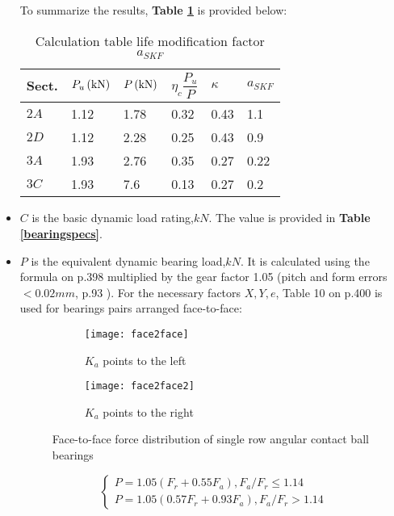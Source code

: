 \begin{itemize}
	To summarize the results, \textbf{Table \ref{askf}} is provided below:
	\begin{table}[ht]
		\centering
		\caption{Calculation table life modification factor $ a_{SKF} $}
		\begin{tabular}{llllll}\toprule
			Sect. & $ P_u \, (\mathrm{kN}) $ & $ P \, (\mathrm{kN}) $ & $ \eta_c \dfrac{P_u}{P} $ & $ \kappa $ & $ a_{SKF} $ \\ \midrule
			$ 2A $ & 1.12 & 1.78 & 0.32 & 0.43 & 1.1\\
			$ 2D $ & 1.12 & 2.28 & 0.25 & 0.43 & 0.9\\
			$ 3A $ & 1.93 & 2.76 & 0.35 & 0.27 & 0.22\\
			$ 3C $ & 1.93 & 7.6  & 0.13 & 0.27 & 0.2\\
			\bottomrule
		\end{tabular}
		\label{askf}
	\end{table}
	\item $ C $ is the basic dynamic load rating,$ \unit{kN} $. The value is provided in \textbf{Table \ref{bearingspecs}}.
	\item $ P $ is the equivalent dynamic bearing load,$ \unit{kN} $. It is calculated using the formula on p.398 \cite{rolling_bearings} multiplied by the gear factor 1.05 (pitch and form errors $ < 0.02 \unit{mm} $, p.93 \cite{rolling_bearings}). For the necessary factors $ X,Y,e $, Table 10 on p.400 \cite{rolling_bearings} is used for bearings pairs arranged face-to-face:
	\begin{figure}[ht]
		\centering
		\begin{subfigure}{.4\linewidth}
			\centering
			\texttt{[image: face2face]}
			\caption{$ K_a $ points to the left}
			\label{face2face}
		\end{subfigure}\hspace*{0.1\linewidth}
		\begin{subfigure}{.4\linewidth}
			\centering
			\texttt{[image: face2face2]}
			\caption{$ K_a $ points to the right}
			\label{face2face2}
		\end{subfigure}
		\caption{Face-to-face force distribution of single row angular contact ball bearings \cite{rolling_bearings}}
	\end{figure}
	\[
	\left\{
	\begin{array}{l}
	P = 1.05(F_r + 0.55F_a), F_a/F_r \leq 1.14\\
	P = 1.05(0.57F_r + 0.93F_a), F_a/F_r > 1.14
	\end{array}
\]
\end{itemize}
